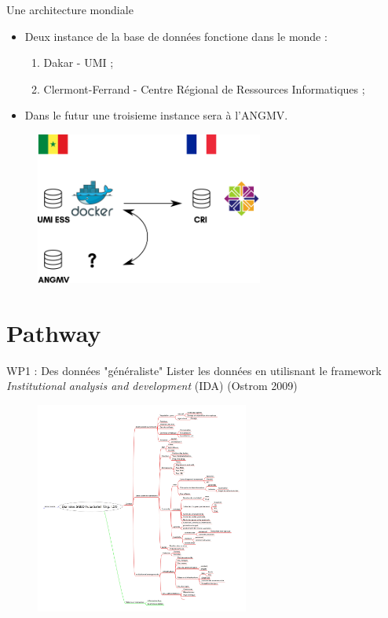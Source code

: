 \documentclass[newPxFont]{beamer}
\begin{document}
\begin{frame}[c]{Une architecture mondiale}
\vspace{-1cm}
\begin{itemize}
	\item Deux instance de la base de données fonctione dans le monde :
	\begin{enumerate}
		\item Dakar - UMI ;
		\item Clermont-Ferrand - Centre Régional de Ressources Informatiques ;
	\end{enumerate}
	\item Dans le futur une troisieme instance sera à l'ANGMV.
\end{itemize}
\begin{figure}
	\centering
	\includegraphics[height=5cm]{img/sch_database}
\end{figure}
\end{frame}


\section{Pathway}


\begin{frame}[c]{WP1 : Des données "généraliste"}
\vspace{-2em}
Lister les données en utilisnant le framework \textit{Institutional analysis and development} (IDA) (Ostrom 2009)
\vspace{-1em}
\begin{figure}
	\centering
	\includegraphics[width = 7cm]{img/IDA_data_org}
\end{figure}
\end{frame}
\end{document}
